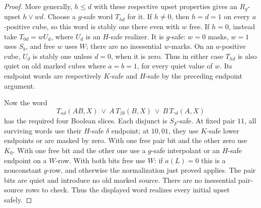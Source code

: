 \begin{proof}
More generally, $h\leq d$ with these respective upset properties gives
an $R_g$-upset $h\vee wd$. Choose a $g$-safe word $T_{hd}$ for it.
If $h\ne0$, then $h=d=1$ on every $a$-positive cube, so this word
is stably one there even with $w$ free. If $h=0$, instead take
$T_{0d}=wU_d$, where $U_d$ is an $H$-safe realizer. It is $g$-safe:
$w=0$ masks, $w=1$ uses $S_b$, and free $w$ uses $W$; there are no
inessential $w$-marks. On an $a$-positive cube, $U_d$ is stably one
unless $d=0$, when it is zero. Thus in either case $T_{hd}$ is also
quiet on old marked cubes where $a=b=1$, for every quiet value of $w$.
Its endpoint words are respectively $K$-safe and $H$-safe by the
preceding endpoint argument.

Now the word
\[
 T_{\alpha\delta}(AB,X)
 \ \vee\ A\,T_{\beta\delta}(B,X)
 \ \vee\ B\,T_{\gamma\delta}(A,X)
\]
has the required four Boolean slices. Each disjunct is $S_F$-safe.
At fixed pair $11$, all surviving words use their $H$-safe
$\delta$ endpoint; at $10,01$, they use $K$-safe lower endpoints or
are masked by zero. With one free pair bit and the other zero use
$K_0$. With one free bit and the other one use a $g$-safe interpolant
or an $H$-safe endpoint on a $W$-row. With both bits free use $W$:
if $a(L)=0$ this is a nonconstant $g$-row, and otherwise the normalization
just proved applies. The pair bits are quiet and introduce no old
marked source. There are no inessential pair-source rows to check.
Thus the displayed word realizes every initial upset safely.
\end{proof}

